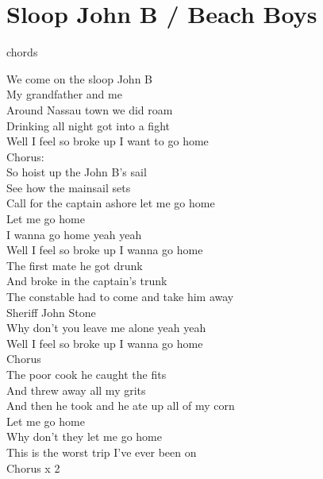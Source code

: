 \section{Sloop John B / Beach Boys}\label{sec:sloop_john_b}
  {\small chords}
  
  \Cmajor
  \Gseven
  \Dseven
  \Aminor
  
   We come on the sloop John B\\
  My grandfather and me\\
  Around Nassau town we did  roam\\
  Drinking all  night  got into a  fight \\
  Well I  feel so broke up  I want to go  home\\
  Chorus:\\
   So hoist up the John B’s sail\\
  See how the mainsail sets\\
  Call for the captain ashore let me go  home\\
  Let me go  home \\
  I wanna go  home yeah  yeah\\
  Well I  feel so broke up  I wanna go  home\\
   The first mate he got drunk\\
  And broke in the captain’s trunk\\
  The constable had to come and take him away\\
  Sheriff John  Stone \\
  Why don’t you leave me alone yeah  yeah\\
  Well I  feel so broke up  I wanna go  home\\
  Chorus\\
   The poor cook he caught the fits\\
  And threw away all my grits\\
  And then he took and he ate up all of my  corn\\
  Let me go  home \\
  Why don’t they let me go  home \\
  This  is the worst trip  I’ve ever been  on\\
  Chorus x 2
